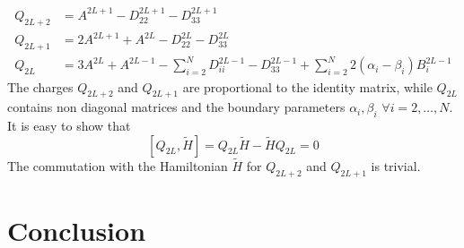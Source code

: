 \documentclass[11pt]{article}
\numberwithin{equation}{section}
\begin{document}
\begin{align}
	Q_{2L+2}&=A^{2L+1}-D_{22}^{2L+1}-D_{33}^{2L+1}\\
	Q_{2L+1}&=2A^{2L+1}+A^{2L}-D_{22}^{2L}-D_{33}^{2L}\\
	Q_{2L}&=3A^{2L}+A^{2L-1}-\sum_{i=2}^{N}D_{ii}^{2L-1}-D_{33}^{2L-1}+\sum_{i=2}^{N}2(\alpha_{i}-\beta_{i})B_{i}^{2L-1}
\end{align}
The charges $Q_{2L+2}$ and $Q_{2L+1}$ are proportional to the identity matrix, while $Q_{2L}$ contains non diagonal matrices and the boundary parameters $\alpha_{i},\beta_{i}$ $\forall i=2,\ldots,N$.\\
It is easy to show that 
\begin{equation}
	\left[Q_{2L},\widetilde{H}\right]=Q_{2L}\widetilde{H}-\widetilde{H}Q_{2L}=0
\end{equation}
The commutation with the Hamiltonian $\widetilde{H}$ for $Q_{2L+2}$ and $Q_{2L+1}$ is trivial. 
\section{Conclusion}




\end{document}
